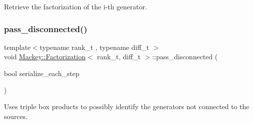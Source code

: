 Retrieve the factorization of the i-\/th generator. 

\mbox{\label{classMackey_1_1Factorization_aad2d840b523d193f4c3554e9e3f7fb00}} 
\subsubsection{\texorpdfstring{pass\+\_\+disconnected()}{pass\_disconnected()}}
{\footnotesize\ttfamily template$<$typename rank\+\_\+t , typename diff\+\_\+t $>$ \\
void \hyperlink{classMackey_1_1Factorization}{Mackey\+::\+Factorization}$<$ rank\+\_\+t, diff\+\_\+t $>$\+::pass\+\_\+disconnected (\begin{DoxyParamCaption}\item[{bool}]{serialize\+\_\+each\+\_\+step }\end{DoxyParamCaption})}



Uses triple box products to possibly identify the generators not connected to the sources. 

